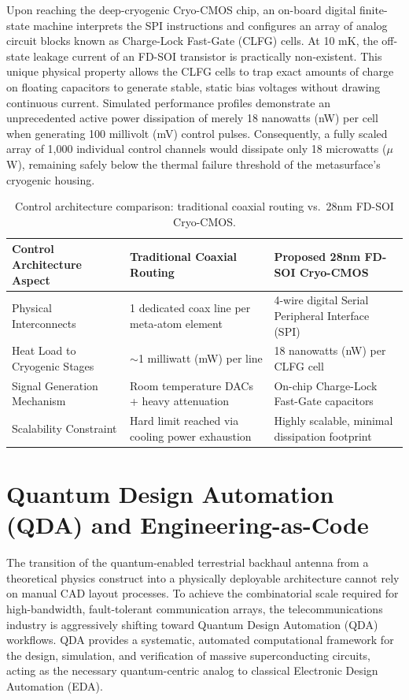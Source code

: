 \documentclass[11pt,a4paper]{article}
\begin{document}
Upon reaching the deep-cryogenic Cryo-CMOS chip, an on-board digital finite-state machine interprets the SPI instructions and configures an array of analog circuit blocks known as Charge-Lock Fast-Gate (CLFG) cells.\cite{ref6} At 10 mK, the off-state leakage current of an FD-SOI transistor is practically non-existent.\cite{ref6} This unique physical property allows the CLFG cells to trap exact amounts of charge on floating capacitors to generate stable, static bias voltages without drawing continuous current.\cite{ref6} Simulated performance profiles demonstrate an unprecedented active power dissipation of merely 18 nanowatts (nW) per cell when generating 100 millivolt (mV) control pulses.\cite{ref6} Consequently, a fully scaled array of 1,000 individual control channels would dissipate only 18 microwatts ($\mu$W), remaining safely below the thermal failure threshold of the metasurface's cryogenic housing.\cite{ref6}

\begin{table}[htbp]
\centering
\caption{Control architecture comparison: traditional coaxial routing vs.\ 28nm FD-SOI Cryo-CMOS.}
\begin{tabular}{@{}lll@{}}
\toprule
Control Architecture Aspect & Traditional Coaxial Routing & Proposed 28nm FD-SOI Cryo-CMOS \\
\midrule
Physical Interconnects & 1 dedicated coax line per meta-atom element & 4-wire digital Serial Peripheral Interface (SPI) \\
Heat Load to Cryogenic Stages & $\sim$1 milliwatt (mW) per line & 18 nanowatts (nW) per CLFG cell \\
Signal Generation Mechanism & Room temperature DACs + heavy attenuation & On-chip Charge-Lock Fast-Gate capacitors \\
Scalability Constraint & Hard limit reached via cooling power exhaustion & Highly scalable, minimal dissipation footprint \\
\bottomrule
\end{tabular}
\end{table}

\section{Quantum Design Automation (QDA) and Engineering-as-Code}

The transition of the quantum-enabled terrestrial backhaul antenna from a theoretical physics construct into a physically deployable architecture cannot rely on manual CAD layout processes.\cite{ref6} To achieve the combinatorial scale required for high-bandwidth, fault-tolerant communication arrays, the telecommunications industry is aggressively shifting toward Quantum Design Automation (QDA) workflows.\cite{ref6} QDA provides a systematic, automated computational framework for the design, simulation, and verification of massive superconducting circuits, acting as the necessary quantum-centric analog to classical Electronic Design Automation (EDA).\cite{ref6}
\end{document}

